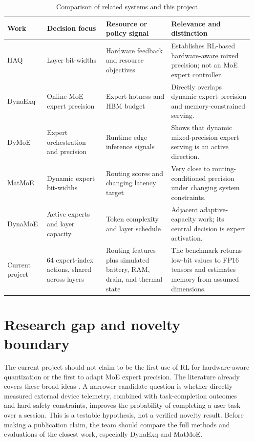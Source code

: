 \documentclass[12pt,a4paper]{report}
\begin{document}
\begin{table}[ht]
\centering
\small
\caption{Comparison of related systems and this project}
\label{tab:literature}
\begin{tabularx}{\linewidth}{@{}L{2.25cm}L{2.5cm}L{3.0cm}Y@{}}
\toprule
Work & Decision focus & Resource or policy signal & Relevance and distinction\\
\midrule
HAQ \citep{wang2019haq} & Layer bit-widths & Hardware feedback and resource objectives & Establishes RL-based hardware-aware mixed precision; not an MoE expert controller.\\
DynaExq \citep{chu2025dynaexq} & Online MoE expert precision & Expert hotness and HBM budget & Directly overlaps dynamic expert precision and memory-constrained serving.\\
DyMoE \citep{huang2026dymoe} & Expert orchestration and precision & Runtime edge inference signals & Shows that dynamic mixed-precision expert serving is an active direction.\\
MatMoE \citep{wei2026matmoe} & Dynamic expert bit-widths & Routing scores and changing latency target & Very close to routing-conditioned precision under changing system constraints.\\
DynaMoE \citep{gulmez2026dynamoe} & Active experts and layer capacity & Token complexity and layer schedule & Adjacent adaptive-capacity work; its central decision is expert activation.\\
Current project & 64 expert-index actions, shared across layers & Routing features plus simulated battery, RAM, drain, and thermal state & The benchmark returns low-bit values to FP16 tensors and estimates memory from assumed dimensions.\\
\bottomrule
\end{tabularx}
\end{table}

\section{Research gap and novelty boundary}
The current project should not claim to be the first use of RL for hardware-aware quantization or the first to adapt MoE expert precision. The literature already covers these broad ideas \citep{wang2019haq,chu2025dynaexq,huang2026dymoe,wei2026matmoe}. A narrower candidate question is whether directly measured external device telemetry, combined with task-completion outcomes and hard safety constraints, improves the probability of completing a user task over a session. This is a testable hypothesis, not a verified novelty result. Before making a publication claim, the team should compare the full methods and evaluations of the closest work, especially DynaExq and MatMoE.
\end{document}
